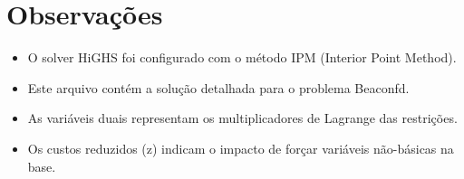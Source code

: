 \documentclass[12pt]{article}
\begin{document}
\section{Observações}

\begin{itemize}
\item O solver HiGHS foi configurado com o método IPM (Interior Point Method).
\item Este arquivo contém a solução detalhada para o problema Beaconfd.
\item As variáveis duais representam os multiplicadores de Lagrange das restrições.
\item Os custos reduzidos (z) indicam o impacto de forçar variáveis não-básicas na base.
\end{itemize}
\end{document}

